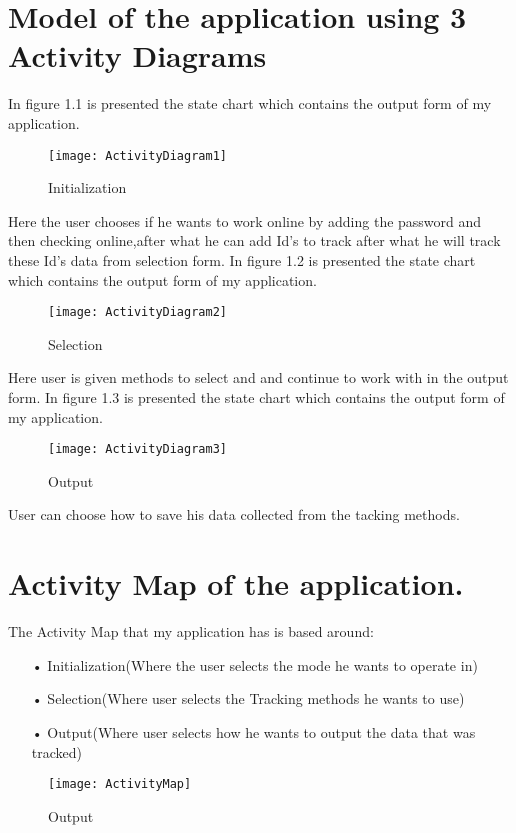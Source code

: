 
\setlength{\parindent}{2ex}
\section{Model of the application using 3 Activity Diagrams}
In figure 1.1 is presented the state chart which contains the output form of my application.
\par
\begin{figure}[h!]
	\centering
	\texttt{[image: ActivityDiagram1]}
	\caption{Initialization} 
\end{figure}
Here the user chooses if he wants to work online by adding the password and then checking online,after what he can add Id's to track after what he will track these Id's data from selection form.
\newpage
In figure 1.2 is presented the state chart which contains the output form of my application.
\begin{figure}[h!]
	\centering
	\texttt{[image: ActivityDiagram2]}
	\caption{Selection} 
\end{figure}
Here user is given methods to select and and continue to work with in the output form.
\newpage
In figure 1.3 is presented the state chart which contains the output form of my application.
\begin{figure}[h!]
	\centering
	\texttt{[image: ActivityDiagram3]}
	\caption{Output} 
\end{figure}
User can choose how to save his data collected from the tacking methods.
\newpage
\section{Activity Map of the application.}
The Activity Map that my application has is based around:
\begin{itemize}
\item[•] Initialization(Where the user selects the mode he wants to operate in)
\item[•] Selection(Where user selects the Tracking methods he wants to use)
\item[•] Output(Where user selects how he wants to output the data that was tracked)
\end{itemize}
\begin{figure}[h!]
	\centering
	\texttt{[image: ActivityMap]}
	\caption{Output} 
\end{figure}
\clearpage
